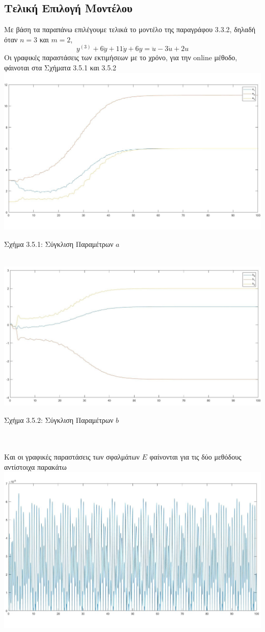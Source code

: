 \documentclass[12pt]{article}
\begin{document}
\subsection{Τελική Επιλογή Μοντέλου}
Με βάση τα παραπάνω επιλέγουμε τελικά το μοντέλο της παραγράφου 3.3.2, δηλαδή όταν $n=3$ και $m=2$, 
\[y^{(3)}+6\ddot{y}+11\dot{y}+6 y=\ddot{u}-3\dot{u}+2u\]
Οι γραφικές παραστάσεις των εκτιμήσεων με το χρόνο, για την online μέθοδο, φάινοται στα Σχήματα 3.5.1 και 3.5.2
\\
\includegraphics[width=\linewidth]{a_est_online.jpg}
\centerline{Σχήμα 3.5.1: Σύγκλιση Παραμέτρων $a$}
\\
\includegraphics[width=\linewidth]{b_est_online.jpg}
\centerline{Σχήμα 3.5.2: Σύγκλιση Παραμέτρων $b$}
\\ \\
Και οι γραφικές παραστάσεις των σφαλμάτων $E$ φαίνονται για τις δύο μεθόδους αντίστοιχα παρακάτω
\\
\includegraphics[width=\linewidth]{offline_error.jpg}
\end{document}
